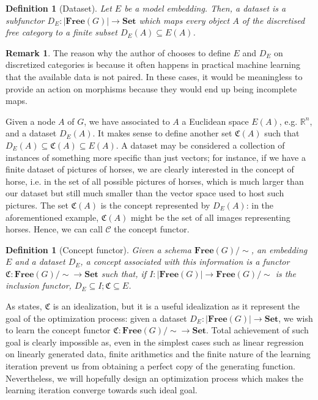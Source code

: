 \documentclass[12pt,a4paper,openright,twoside]{report}
\theoremstyle{plain}
\newtheorem{definition}[proposition]{Definition}
\theoremstyle{definition}
\newtheorem{remark}[proposition]{Remark}
\begin{document}
\begin{definition}[Dataset]
  Let $E$ be a model embedding. Then, a dataset is a subfunctor $D_E: |\mathbf{Free}(G)| \to \mathbf{Set}$ which maps every object $A$ of the discretised free category to a finite subset $D_E(A) \subseteq E(A)$.
\end{definition}

\begin{remark}
  The reason why the author of \cite{gavranovic2019compositional} chooses to define $E$ and $D_E$ on discretized categories is because it often happens in practical machine learning that the available data is not paired. In these cases, it would be meaningless to provide an action on morphisms because they would end up being incomplete maps.
\end{remark}

Given a node $A$ of $G$, we have associated to $A$ a Euclidean space $E(A)$, e.g. $\mathbb{R}^n$, and a dataset $D_E(A)$. It makes sense to define another set $\mathfrak{C}(A)$ such that $D_E(A) \subseteq \mathfrak{C}(A) \subseteq E(A)$. A dataset may be considered a collection of instances of something more specific than just vectors; for instance, if we have a finite dataset of pictures of horses, we are clearly interested in the concept of horse, i.e. in the set of all possible pictures of horses, which is much larger than our dataset but still much smaller than the vector space used to host such pictures. The set $\mathfrak{C}(A)$ is the concept represented by $D_E(A)$: in the aforementioned example, $\mathfrak{C}(A)$ might be the set of all images representing horses. Hence, we can call $\mathcal{C}$ the concept functor. 

\begin{definition}[Concept functor]
  Given a schema $\mathbf{Free}(G)/{\sim}$, an embedding $E$ and a dataset $D_E$, a concept associated with this information is a functor $\mathfrak{C}: \mathbf{Free}(G)/{\sim} \to \mathbf{Set}$ such that, if $I: |\mathbf{Free}(G)| \to \mathbf{Free}(G)/{\sim}$ is the inclusion functor, $D_E \subseteq I;\mathfrak{C} \subseteq E$.
\end{definition}

As \cite{gavranovic2019compositional} states, $\mathfrak{C}$ is an idealization, but it is a useful idealization as it represent the goal of the optimization process: given a dataset $D_E: |\mathbf{Free}(G)| \to \mathbf{Set}$, we wish to learn the concept functor $\mathfrak{C}: \mathbf{Free}(G)/{\sim} \to \mathbf{Set}$. Total achievement of such goal is clearly impossible as, even in the simplest cases such as linear regression on linearly generated data, finite arithmetics and the finite nature of the learning iteration prevent us from obtaining a perfect copy of the generating function.
Nevertheless, we will hopefully design an optimization process which makes the learning iteration converge towards such ideal goal.
\end{document}
